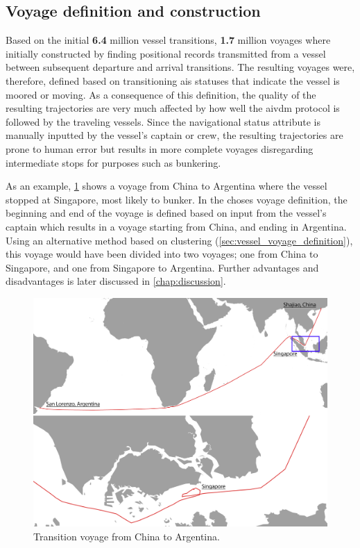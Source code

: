 \subsection{Voyage definition and construction}

Based on the initial \textbf{6.4} million vessel transitions, \textbf{1.7} million voyages where initially constructed by finding positional records transmitted from a vessel between subsequent departure and arrival transitions. The resulting voyages were, therefore, defined based on transitioning \acrshort{ais} statuses that indicate the vessel is moored or moving. As a consequence of this definition, the quality of the resulting trajectories are very much affected by how well the \gls{aivdm} protocol is followed by the traveling vessels. Since the navigational status attribute is manually inputted by the vessel's captain or crew, the resulting trajectories are prone to human error but results in more complete voyages disregarding intermediate stops for purposes such as bunkering.

As an example, \cref{fig:transition_voyage} shows a voyage from China to Argentina where the vessel stopped at Singapore, most likely to bunker. In the choses voyage definition, the beginning and end of the voyage is defined based on input from the vessel's captain which results in a voyage starting from China, and ending in Argentina. Using an alternative method based on clustering (\cref{sec:vessel_voyage_definition}), this voyage would have been divided into two voyages; one from China to Singapore, and one from Singapore to Argentina. Further advantages and disadvantages is later discussed in \cref{chap:discussion}.

\begin{figure}[htbp]
    \centering
    \includegraphics[width=1.0\textwidth]{figures/results/voyage_quality}
    \caption{Transition voyage from China to Argentina.}
    \label{fig:transition_voyage}
\end{figure}

